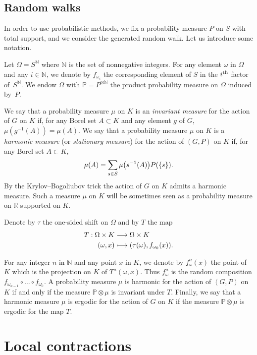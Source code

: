 \documentclass[10pt]{amsart}
\theoremstyle{definition}\newtheorem{defi}[theo]{Definition}\newtheorem{rema}[theo]{Remark}\newtheorem{exam}[theo]{Example}\newtheorem{exem}[theo]{Example}\newtheorem{nota}[theo]{Notation}
\newcommand{\bbP}{\mathbb{P}}
\newcommand{\R}{\mathbb{R}}
\newcommand{\N}{\mathbb{N}}
\let\oldmapsto\mapsto
\renewcommand*{\mapsto}{\mathchoice{\longmapsto}{\oldmapsto}{\oldmapsto}{\oldmapsto}}
\renewcommand*{\to}{\mathchoice{\longrightarrow}{\rightarrow}{\rightarrow}{\rightarrow}}
\let\originalleft\left
\let\originalright\right
\renewcommand{\left}{\mathopen{}\mathclose\bgroup\originalleft}
\renewcommand{\right}{\aftergroup\egroup\originalright}
\begin{document}
\subsection{Random walks}\label{randomwalk}
In order to use probabilistic methods, we fix a probability measure $P$ on $S$ with total support, and we consider the generated random walk. Let us introduce some notation.

Let $\Omega=S^{\N}$ where $\N$ is the set of nonnegative integers. For any element $\omega$ in $\Omega$ and any $i \in \N$, we denote by $f_{\omega_{i}}$ the corresponding element of $S$ in the $i^{\rm th}$ factor of~$S^{\N}$. We endow $\Omega$ with $\bbP=P^{\otimes\N}$ the product probability measure on $\Omega$ induced by~$P$.

We say that a probability measure $\mu$ on $K$ is an \emph{invariant measure} for the action of $G$ on $K$ if, for any Borel set $A \subset K$ and any element $g$ of $G$, $\mu(g^{-1}(A))= \mu(A)$. We say that a probability measure $\mu$ on $K$ is a \emph{harmonic measure} (or \emph{stationary measure}) for the action of $(G,P)$ on $K$ if, for any Borel set $A \subset K$,
\[
\mu(A)= \sum _{s \in S} \mu\left(s^{-1}(A)\right)P(\{s\}).
\]
By the Krylov--Bogoliubov trick the action of $G$ on $K$ admits a harmonic measure. Such a measure $\mu$ on $K$ will be sometimes seen as a probability measure on $\R$ supported on $K$.

Denote by $\tau$ the one-sided shift on $\Omega$ and by $T$ the map
\begin{align*}
T:  \Omega \times K  &\to  \Omega \times K \\
 (\omega,x)  &\mapsto  (\tau(\omega),f_{\omega_{0}}(x)).
\end{align*}


For any integer $n$ in $\N$ and any point $x$ in $K$, we denote by $f_{\omega}^{n}(x)$ the point of $K$ which is the projection on $K$ of $T^{n}(\omega,x)$. Thus $f_{\omega}^n$ is the random composition $f_{\omega_{n-1}}\circ \dots \circ f_{\omega_0}$. A probability measure $\mu$ is harmonic for the action of $(G,P)$ on $K$ if and only if the measure $\bbP \otimes \mu$ is invariant under $T$. Finally, we say that a harmonic measure $\mu$ is ergodic for the action of $G$ on $K$ if the measure $\bbP \otimes \mu$ is ergodic for the map $T$.


\pagebreak
\section{Local contractions}
\end{document}
